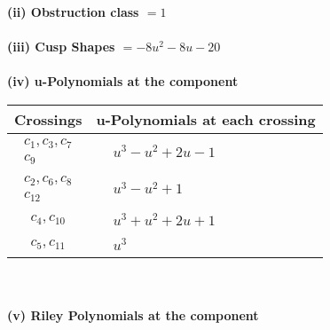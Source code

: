 \documentclass[1p]{elsarticle_modified}
\theoremstyle{definition}
\begin{document}
\flushleft \textbf{(ii) Obstruction class $= 1$}\\~\\
\flushleft \textbf{(iii) Cusp Shapes $= -8 u^2-8 u-20$}\\~\\
\newpage\renewcommand{\arraystretch}{1}
\flushleft \textbf{(iv) u-Polynomials at the component}\newline \\
\begin{tabular}{m{50pt}|m{274pt}}
Crossings & \hspace{64pt}u-Polynomials at each crossing \\
\hline $$\begin{aligned}c_{1},c_{3},c_{7}\\c_{9}\end{aligned}$$&$\begin{aligned}
&u^3- u^2+2 u-1
\end{aligned}$\\
\hline $$\begin{aligned}c_{2},c_{6},c_{8}\\c_{12}\end{aligned}$$&$\begin{aligned}
&u^3- u^2+1
\end{aligned}$\\
\hline $$\begin{aligned}c_{4},c_{10}\end{aligned}$$&$\begin{aligned}
&u^3+u^2+2 u+1
\end{aligned}$\\
\hline $$\begin{aligned}c_{5},c_{11}\end{aligned}$$&$\begin{aligned}
&u^3
\end{aligned}$\\
\hline
\end{tabular}\\~\\
\newpage\renewcommand{\arraystretch}{1}
\flushleft \textbf{(v) Riley Polynomials at the component}\newline \\
\end{document}
